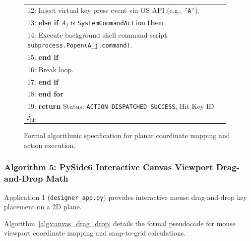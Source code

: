 \begin{figure}[htbp]
\begin{minipage}{0.92\textwidth}
\begin{tabular}{|p{0.96\linewidth}|}
{\small 12: \hspace{2em} \hspace{1em} Inject virtual key press event via OS API (e.g., \texttt{'A'}).} \\
{\small 13: \hspace{2em} \textbf{else if} $A_j$ is \texttt{SystemCommandAction} \textbf{then}} \\
{\small 14: \hspace{2em} \hspace{1em} Execute background shell command script: \texttt{subprocess.Popen(A\_j.command)}.} \\
{\small 15: \hspace{2em} \textbf{end if}} \\
{\small 16: \hspace{2em} Break loop.} \\
{\small 17: \hspace{1em} \textbf{end if}} \\
{\small 18: \textbf{end for}} \\
{\small 19: \textbf{return} Status: \texttt{ACTION\_DISPATCHED\_SUCCESS}, Hit Key ID $j_{\text{hit}}$} \\
\hline
\end{tabular}
\end{minipage}
\caption{Formal algorithmic specification for planar coordinate mapping and action execution.}
\label{alg:coordinate_mapping}
\end{figure}

\subsubsection{Algorithm 5: PySide6 Interactive Canvas Viewport Drag-and-Drop Math}
Application 1 (\texttt{designer\_app.py}) provides interactive mouse drag-and-drop key placement on a 2D plane.

Algorithm~\ref{alg:canvas_drag_drop} details the formal pseudocode for mouse viewport coordinate mapping and snap-to-grid calculations.


